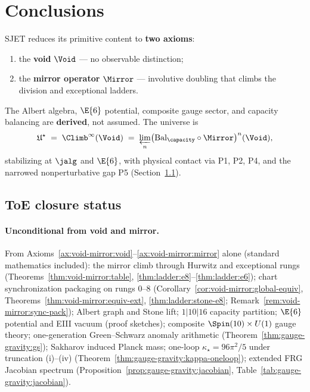 \section{Conclusions}
\label{sec:conclusions}

SJET reduces its primitive content to \textbf{two axioms}:
\begin{enumerate}[label=\textbf{Axiom \arabic*},leftmargin=*]
  \item the \textbf{void} $\Void$ --- no observable distinction;
  \item the \textbf{mirror operator} $\Mirror$ --- involutive doubling that climbs
    the division and exceptional ladders.
\end{enumerate}

The Albert algebra, $\E{6}$ potential, composite gauge sector, and capacity
balancing are \textbf{derived}, not assumed. The universe is
\begin{equation}
  \mathfrak{U}^\star\;=\;\Climb^\infty(\Void)
  \;=\;\varprojlim_n\bigl(\mathrm{Bal}_\capacity\circ\Mirror\bigr)^n(\Void),
\end{equation}
stabilizing at $\jalg$ and $\E{6}$, with physical contact via P1, P2, P4, and
the narrowed nonperturbative gap P5 (Section~\ref{sec:conclusions:toe}).

\subsection{ToE closure status}
\label{sec:conclusions:toe}

\paragraph{Unconditional from void and mirror.}
From Axioms~\ref{ax:void-mirror:void}--\ref{ax:void-mirror:mirror} alone
(standard mathematics included): the mirror climb through Hurwitz and
exceptional rungs (Theorems~\ref{thm:void-mirror:table},
\ref{thm:ladder:e8}--\ref{thm:ladder:e6}); chart synchronization packaging
on rungs $0$--$8$ (Corollary~\ref{cor:void-mirror:global-equiv},
Theorems~\ref{thm:void-mirror:equiv-ext}, \ref{thm:ladder:stone-e8};
Remark~\ref{rem:void-mirror:sync-pack});
Albert graph and Stone lift;
$1|10|16$ capacity partition; $\E{6}$ potential and EIII vacuum (proof
sketches); composite $\Spin(10)\times U(1)$ gauge theory; one-generation
Green--Schwarz anomaly arithmetic (Theorem~\ref{thm:gauge-gravity:gs});
Sakharov induced Planck mass; one-loop
$\kappa_\star=96\pi^2/5$ under truncation (i)--(iv)
(Theorem~\ref{thm:gauge-gravity:kappa-oneloop}); extended FRG Jacobian
spectrum (Proposition~\ref{prop:gauge-gravity:jacobian},
Table~\ref{tab:gauge-gravity:jacobian}).

